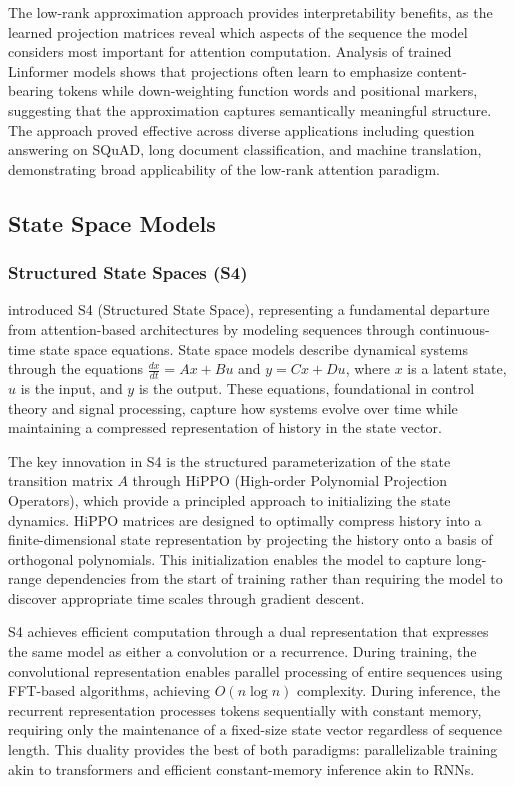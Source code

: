 \documentclass[11pt,letterpaper]{article}
\begin{document}
The low-rank approximation approach provides interpretability benefits, as the learned projection matrices reveal which aspects of the sequence the model considers most important for attention computation. Analysis of trained Linformer models shows that projections often learn to emphasize content-bearing tokens while down-weighting function words and positional markers, suggesting that the approximation captures semantically meaningful structure. The approach proved effective across diverse applications including question answering on SQuAD, long document classification, and machine translation, demonstrating broad applicability of the low-rank attention paradigm.

\subsection{State Space Models}

\subsubsection{Structured State Spaces (S4)}

\cite{gu2022efficiently} introduced S4 (Structured State Space), representing a fundamental departure from attention-based architectures by modeling sequences through continuous-time state space equations. State space models describe dynamical systems through the equations $\frac{dx}{dt} = Ax + Bu$ and $y = Cx + Du$, where $x$ is a latent state, $u$ is the input, and $y$ is the output. These equations, foundational in control theory and signal processing, capture how systems evolve over time while maintaining a compressed representation of history in the state vector.

The key innovation in S4 is the structured parameterization of the state transition matrix $A$ through HiPPO (High-order Polynomial Projection Operators), which provide a principled approach to initializing the state dynamics. HiPPO matrices are designed to optimally compress history into a finite-dimensional state representation by projecting the history onto a basis of orthogonal polynomials. This initialization enables the model to capture long-range dependencies from the start of training rather than requiring the model to discover appropriate time scales through gradient descent.

S4 achieves efficient computation through a dual representation that expresses the same model as either a convolution or a recurrence. During training, the convolutional representation enables parallel processing of entire sequences using FFT-based algorithms, achieving $O(n \log n)$ complexity. During inference, the recurrent representation processes tokens sequentially with constant memory, requiring only the maintenance of a fixed-size state vector regardless of sequence length. This duality provides the best of both paradigms: parallelizable training akin to transformers and efficient constant-memory inference akin to RNNs.
\end{document}
